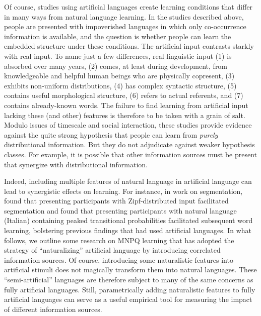\documentclass[man,longtable, floatmark]{my-apa6}
\begin{document}
Of course, studies using artificial languages create learning conditions that differ in many ways from natural language learning.
In the studies described above, people are presented with impoverished languages in which only co-occurrence information is available, and the question is whether people can learn the embedded structure under these conditions.
The artificial input contrasts starkly with real input.
To name just a few differences, real linguistic input (1) is absorbed over many years, (2) comes, at least during development, from knowledgeable and helpful human beings who are physically copresent, (3) exhibits non-uniform distributions, (4) has complex syntactic structure, (5) contains useful morphological structure, (6) refers to actual referents, and (7) contains already-known words.
The failure to find learning from artificial input lacking these (and other) features is therefore to be taken with a grain of salt.
Modulo issues of timescale and social interaction, these studies provide evidence against the quite strong hypothesis that people can learn from \emph{purely} distributional information.
But they do not adjudicate against weaker hypothesis classes.
For example, it is possible that other information sources must be present that synergize with distributional information.

Indeed, including multiple features of natural language in artificial language can lead to synergistic effects on learning.
For instance, in work on segmentation, \citet{kurumada13} found that presenting participants with Zipf-distributed input facilitated segmentation and \citet{hay11} found that presenting participants with natural language (Italian) containing peaked transitional probabilities facilitated subsequent word learning, bolstering previous findings that had used artificial languages.
In what follows, we outline some research on MNPQ learning that has adopted the strategy of ``naturalizing'' artificial language by introducing correlated information sources.
Of course, introducing some naturalistic features into artificial stimuli does not magically transform them into natural languages.
These ``semi-artificial'' languages are therefore subject to many of the same concerns as fully artificial languages.
Still, parametrically adding naturalistic features to fully artificial languages can serve as a useful empirical tool for measuring the impact of different information sources.
\end{document}
